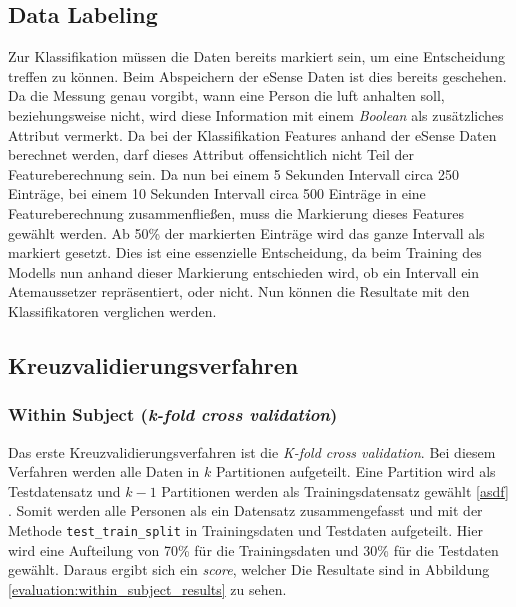 \subsection{Data Labeling}
Zur Klassifikation müssen die Daten bereits markiert sein, um eine Entscheidung treffen zu können. 
Beim Abspeichern der eSense Daten ist dies bereits geschehen. 
Da die Messung genau vorgibt, wann eine Person die luft anhalten soll, beziehungsweise nicht, wird diese Information mit einem \textit{Boolean} als zusätzliches Attribut vermerkt.
Da bei der Klassifikation Features anhand der eSense Daten berechnet werden, darf dieses Attribut offensichtlich nicht Teil der Featureberechnung sein.
Da nun bei einem 5 Sekunden Intervall circa 250 Einträge, bei einem 10 Sekunden Intervall circa 500 Einträge in eine Featureberechnung zusammenfließen, muss die Markierung dieses Features gewählt werden.
Ab 50\% der markierten Einträge wird das ganze Intervall als markiert gesetzt.
Dies ist eine essenzielle Entscheidung, da beim Training des Modells nun anhand dieser Markierung entschieden wird, ob ein Intervall ein Atemaussetzer repräsentiert, oder nicht.
Nun können die Resultate mit den Klassifikatoren verglichen werden.

\subsection{Kreuzvalidierungsverfahren}
\subsubsection{Within Subject (\textit{k-fold cross validation})}
Das erste Kreuzvalidierungsverfahren ist die \textit{K-fold cross validation}.
Bei diesem Verfahren werden alle Daten in $k$ Partitionen aufgeteilt.
Eine Partition wird als Testdatensatz und $k-1$ Partitionen werden als Trainingsdatensatz gewählt \ref{asdf} .
Somit werden alle Personen als ein Datensatz zusammengefasst und mit der Methode \texttt{test\_train\_split} in Trainingsdaten und Testdaten aufgeteilt.
Hier wird eine Aufteilung von 70\% für die Trainingsdaten und 30\% für die Testdaten gewählt. 
Daraus ergibt sich ein \textit{score}, welcher 
Die Resultate sind in Abbildung \ref{evaluation:within_subject_results} zu sehen.

